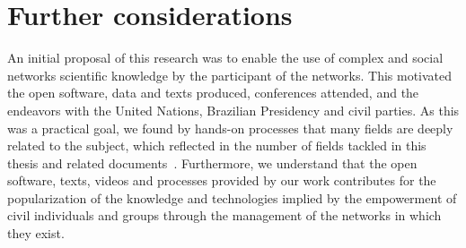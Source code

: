 \section{Further considerations}
An initial proposal of this research was to enable
the use of complex and social networks scientific knowledge by the participant of the networks.
This motivated the open software, data and texts produced, conferences attended, and the endeavors with
the United Nations, Brazilian Presidency and civil parties.
As this was a practical goal, we found by hands-on processes that
many fields are deeply related to the subject, which reflected in the number of fields tackled in this thesis
and related documents~\cite{pnud3,pnud4,opa,anPhy,ccs15,dialogaAlg,losd,versinus,kolmSmir}.
Furthermore, we understand that the open software, texts, videos and processes provided
by our work contributes for the popularization of the knowledge and technologies implied
by the empowerment of civil individuals and groups through the management of the
networks in which they exist.



